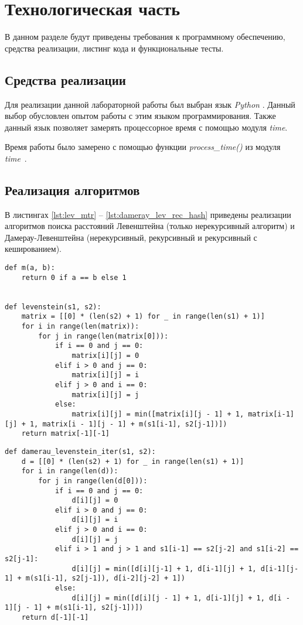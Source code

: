\chapter{Технологическая часть}

В данном разделе будут приведены требования к программному обеспечению, средства реализации, листинг кода и функциональные тесты.

\section{Средства реализации}

Для реализации данной лабораторной работы был выбран язык \textit{Python} \cite{python}. Данный выбор обусловлен опытом работы с этим языком программирования. Также данный язык позволяет замерять процессорное время с помощью модуля \textit{time}.

Время работы было замерено с помощью функции \textit{process\_time()} из модуля \textit{time}~\cite{python-time}.

\section{Реализация алгоритмов}

В листингах \ref{lst:lev_mtr} -- \ref{lst:dameray_lev_rec_hash} приведены реализации алгоритмов поиска расстояний Левенштейна (только нерекурсивный алгоритм) и Дамерау-Левенштейна (нерекурсивный, рекурсивный и рекурсивный с кешированием).

\clearpage

\begin{lstlisting}[label=lst:lev_mtr,caption=Функция нахождения расстояния Левенштейна с использованием матрицы]
def m(a, b):
	return 0 if a == b else 1


def levenstein(s1, s2):
	matrix = [[0] * (len(s2) + 1) for _ in range(len(s1) + 1)]
	for i in range(len(matrix)):
		for j in range(len(matrix[0])):
			if i == 0 and j == 0:
				matrix[i][j] = 0
			elif i > 0 and j == 0:
				matrix[i][j] = i
			elif j > 0 and i == 0:
				matrix[i][j] = j
			else:
				matrix[i][j] = min([matrix[i][j - 1] + 1, matrix[i-1][j] + 1, matrix[i - 1][j - 1] + m(s1[i-1], s2[j-1])])
	return matrix[-1][-1]
\end{lstlisting}

\clearpage

\begin{lstlisting}[label=lst:dameray_lev_rec,caption=Функция нахождения расстояния Дамерау-Левенштейна с использованием матрицы]
def damerau_levenstein_iter(s1, s2):
	d = [[0] * (len(s2) + 1) for _ in range(len(s1) + 1)]
	for i in range(len(d)):
		for j in range(len(d[0])):
			if i == 0 and j == 0:
				d[i][j] = 0
			elif i > 0 and j == 0:
				d[i][j] = i
			elif j > 0 and i == 0:
				d[i][j] = j
			elif i > 1 and j > 1 and s1[i-1] == s2[j-2] and s1[i-2] == s2[j-1]:
				d[i][j] = min([d[i][j-1] + 1, d[i-1][j] + 1, d[i-1][j-1] + m(s1[i-1], s2[j-1]), d[i-2][j-2] + 1])
			else:
				d[i][j] = min([d[i][j - 1] + 1, d[i-1][j] + 1, d[i - 1][j - 1] + m(s1[i-1], s2[j-1])])
	return d[-1][-1]
\end{lstlisting}

